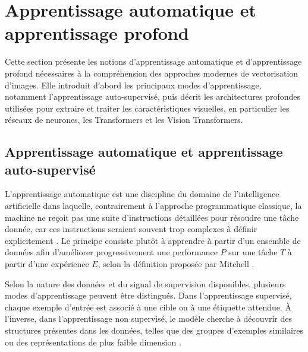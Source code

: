 \documentclass[12pt, a4paper, oneside]{report}
\begin{document}
\section{Apprentissage automatique et apprentissage profond}

Cette section présente les notions d'apprentissage automatique et d'apprentissage profond nécessaires à la compréhension des approches modernes de vectorisation d'images. Elle introduit d'abord les principaux modes d'apprentissage, notamment l'apprentissage auto-supervisé, puis décrit les architectures profondes utilisées pour extraire et traiter les caractéristiques visuelles, en particulier les réseaux de neurones, les Transformers et les Vision Transformers.

\subsection{Apprentissage automatique et apprentissage auto-supervisé}
	L'apprentissage automatique est une discipline du domaine de l'intelligence artificielle dans laquelle, contrairement à l'approche programmatique classique, la machine ne reçoit pas une suite d'instructions détaillées pour résoudre une tâche donnée, car ces instructions seraient souvent trop complexes à définir explicitement \cite{geron2022hands}. Le principe consiste plutôt à apprendre à partir d'un ensemble de données afin d'améliorer progressivement une performance $P$ sur une tâche $T$ à partir d'une expérience $E$, selon la définition proposée par Mitchell \cite{mitchell1997ml}.

Selon la nature des données et du signal de supervision disponibles, plusieurs modes d'apprentissage peuvent être distingués. Dans l'apprentissage supervisé, chaque exemple d'entrée est associé à une cible ou à une étiquette attendue. À l'inverse, dans l'apprentissage non supervisé, le modèle cherche à découvrir des structures présentes dans les données, telles que des groupes d'exemples similaires ou des représentations de plus faible dimension \cite{bishop2006pattern}.
\end{document}
